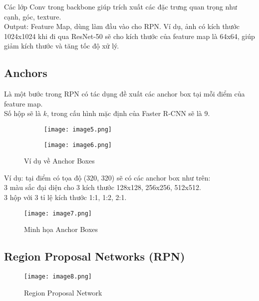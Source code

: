 \documentclass{article}
\begin{document}
Các lớp Conv trong backbone giúp trích xuất các đặc trưng quan trọng như cạnh, góc, texture. \\
Output: Feature Map, dùng làm đầu vào cho RPN. Ví dụ, ảnh có kích thước 1024x1024 khi đi qua ResNet-50 sẽ cho kích thước của feature map là 64x64, giúp giảm kích thước và tăng tốc độ xử lý.

\subsection{Anchors}
Là một bước trong RPN có tác dụng đề xuất các anchor box tại mỗi điểm của feature map. \\
Số hộp sẽ là $k$, trong cấu hình mặc định của Faster R-CNN sẽ là 9.

\begin{figure}[H]
    \begin{subfigure}{0.45\textwidth}
        \centering
        \texttt{[image: image5.png]}
    \end{subfigure}
    \hfill
    \begin{subfigure}{0.45\textwidth}
        \centering
        \texttt{[image: image6.png]}
    \end{subfigure}
    \caption{Ví dụ về Anchor Boxes}
\end{figure}

Ví dụ: tại điểm có tọa độ (320, 320) sẽ có các anchor box như trên: \\
3 màu sắc đại diện cho 3 kích thước 128x128, 256x256, 512x512. \\
3 hộp với 3 tỉ lệ kích thước 1:1, 1:2, 2:1.

\begin{figure}[H]
    \centering
    \texttt{[image: image7.png]}
    \caption{Minh họa Anchor Boxes}
\end{figure}

\subsection{Region Proposal Networks (RPN)}
\begin{figure}[H]
    \centering
    \texttt{[image: image8.png]}
    \caption{Region Proposal Network}
\end{figure}
\end{document}
